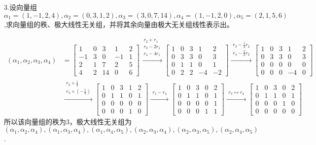 \documentclass{article}
\begin{document}
3.设向量组$\alpha_{1}=(1,-1,2,4),\alpha_{2}=(0,3,1,2),\alpha_{3}=(3,0,7,14),\alpha_{4}=(1,-1,2,0),\alpha_{5}=(2,1,5,6)$,求向量组的秩、极大线性无关组，并将其余向量由极大无关组线性表示出。

\begin{jie}
\begin{align*}
(\alpha_1,\alpha_2,\alpha_3,\alpha_4)&=
\begin{bmatrix}
  1 & 0 & 3 &1 &2\\
  -1 & 3 & 0&-1&1\\
  2 & 1 & 7&2&5\\
  4 & 2 &14&0&6
\end{bmatrix}
\xrightarrow{\substack{r_{2}+r_{1}\\ r_3-2r_1 \\ r_4-4r_1}}
{
\begin{bmatrix}
  1 & 0 & 3 &1&2\\
  0 & 3 & 3&0&3\\
  0 & 1 & 1&0&1\\
  0 & 2 &2&-4&-2
\end{bmatrix}
}
\xrightarrow{\substack{ r_3-\frac{1}{3}r_2 \\ r_4-\frac{2}{3}r_2}}
{
\begin{bmatrix}
  1 & 0 & 3 &1&2\\
  0 & 3 & 3&0&3\\
  0 & 0 & 0&0&0\\
  0 & 0 &0&-4&0
\end{bmatrix}
}\\
&
\xrightarrow{\substack{ r_2\times\frac{1}{3} \\ r_4\times\left(-\frac{1}{4}\right)}}
{
\begin{bmatrix}
  1 & 0 & 3 &1&2\\
  0 & 1 & 1&0&1\\
  0 & 0 & 0&0&0\\
  0 & 0 &0&1&0
\end{bmatrix}
}
\xrightarrow{\substack{ r_1-r_4}}
{
\begin{bmatrix}
  1 & 0 & 3 &0&2\\
  0 & 1 & 1&0&1\\
  0 & 0 & 0&0&1\\
  0 & 0 &0&1&1
\end{bmatrix}
}
\xrightarrow{\substack{ r_3\leftrightarrow r_4}}
{
\begin{bmatrix}
  1 & 0 & 3 &0&2\\
  0 & 1 & 1&0&1\\
  0 & 0 & 0&1& 0\\
  0 & 0 &0&0& 0
\end{bmatrix}
}
\end{align*}
所以该向量组的秩为$3$，极大线性无关组为$(\alpha_1,\alpha_2,\alpha_4),(\alpha_1,\alpha_3,\alpha_4),(\alpha_1,\alpha_4,\alpha_5),(\alpha_2,\alpha_3,\alpha_4),(\alpha_2,\alpha_3,\alpha_5),(\alpha_2,\alpha_4,\alpha_5)$.


\end{jie}
\end{document}
